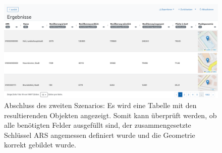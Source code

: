 \begin{figure}
  \centering
  \includegraphics[width=.95\textwidth]{assets/results-szenario-2.png}
  \caption[Ergebnistabelle am Ende des zweiten Szenarios]{Abschluss des zweiten Szenarios: Es wird eine Tabelle mit den resultierenden Objekten angezeigt. Somit kann überprüft werden, ob alle benötigten Felder ausgefüllt sind, der zusammengesetzte Schlüssel \ac{ARS} angemessen definiert wurde und die Geometrie korrekt gebildet wurde.}
  \label{fig:scenario-result}
\end{figure}

